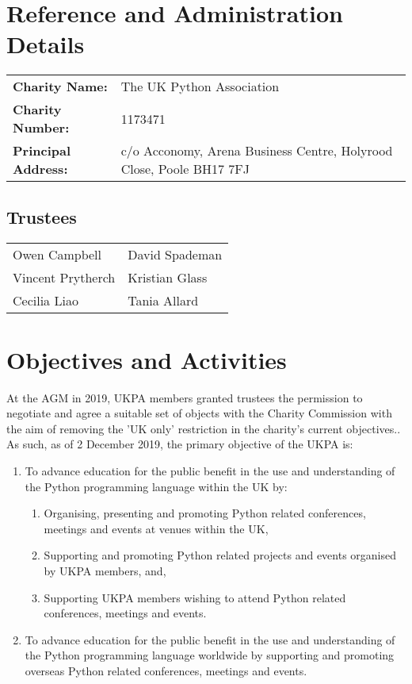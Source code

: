 \documentclass[11pt, final]{article}
\begin{document}

    \section{Reference and Administration Details}
    \begin{tabular}{l l}
        \textbf{Charity Name:} & The UK Python Association \\
        \textbf{Charity Number:} & 1173471 \\
        \textbf{Principal Address:} & c/o Acconomy, Arena Business Centre, Holyrood Close, Poole BH17 7FJ\\
    \end{tabular}

        \subsection{Trustees}
        \begin{tabular}{l l}
            Owen Campbell & David Spademan\\
            Vincent Prytherch & Kristian Glass\\
            Cecilia Liao & Tania Allard\\
        \end{tabular}

    \section{Objectives and Activities}
	At the AGM in 2019, UKPA members granted trustees the permission to negotiate and agree a suitable set of objects with the Charity Commission with the aim of removing the 'UK only' restriction in the charity's current objectives.. As such, as of 2 December 2019, the primary objective of the UKPA is:

	\begin{enumerate}
		\item To advance education for the public benefit in the use and understanding of the Python programming language within the UK by:
		\begin{enumerate}
			\item Organising, presenting and promoting Python related conferences, meetings and events at venues within the UK,
			\item Supporting and promoting Python related projects and events organised by UKPA members, and,
			\item Supporting UKPA members wishing to attend Python related conferences, meetings and events.
		\end{enumerate}
		\item To advance education for the public benefit in the use and understanding of the Python programming language worldwide by supporting and promoting overseas Python related conferences, meetings and events.
	\end{enumerate}
\end{document}
